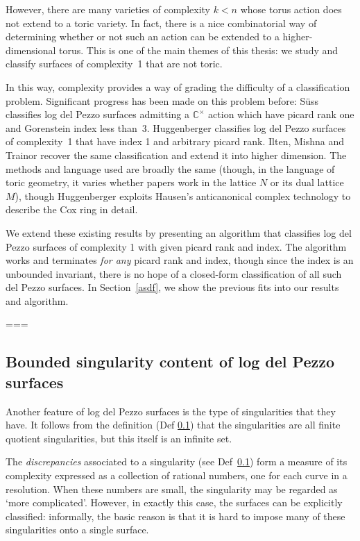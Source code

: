\documentclass[11pt]{amsart}
\theoremstyle{definition}
\theoremstyle{definition}
\theoremstyle{definition}
\theoremstyle{definition}
\theoremstyle{definition}
\theoremstyle{definition}
\theoremstyle{definition}
\begin{document}
However, there are many varieties of complexity $k<n$ whose torus action does not extend to a toric variety. In fact, there is a nice combinatorial way of determining whether or not such an action can be extended to a higher-dimensional torus. This is one of the main themes of this thesis: we study
and classify surfaces of complexity~1 that are not toric.

In this way, complexity provides a way of grading the difficulty of a classification problem. Significant progress has been made on this problem before: S\"{u}ss \cite{Suss} classifies log del Pezzo surfaces admitting a $\mathbb{C}^\times$ action which have picard rank one and Gorenstein index less than~3. Huggenberger \cite{Huggenberger} classifies log del Pezzo surfaces of complexity~1 that have index 1 and arbitrary picard rank. Ilten, Mishna and Trainor \cite{IMT} recover the same classification and extend it into higher dimension. The methods and language used are broadly the same (though, in the language of toric geometry, it varies whether papers work in the lattice $N$ or its dual lattice $M$), though Huggenberger exploits Hausen's anticanonical complex technology to describe the Cox ring in detail. 

We extend these existing results by presenting an algorithm that classifies
log del Pezzo surfaces of complexity 1 with given picard rank and index.
The algorithm works and terminates {\em for any} picard rank and index, 
though since the index is an unbounded invariant, there is no hope of 
a closed-form classification of all such del Pezzo surfaces.
In Section~\ref{asdf}, we show the previous fits into our results and algorithm. 


===

\subsection{Bounded singularity content of log del Pezzo surfaces}

Another feature of log del Pezzo surfaces is the type of singularities
that they have. It follows from the definition (Def \ref{}) that the singularities
are all finite quotient singularities, but this itself is an infinite set.

The {\em discrepancies} associated to a singularity (see Def~\ref{}) form a measure of
its complexity expressed as a collection of rational numbers, one for each curve in a resolution. 
When these numbers are small, the singularity may be regarded as `more complicated'.
However, in exactly this case, the surfaces can be explicitly classified: informally,
the basic reason is that it is hard to impose many of these singularities onto a single surface.
\end{document}
